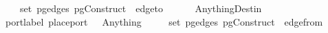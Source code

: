 \ \ \ {\isachardoublequoteopen}{\isasymnot}{\isacharparenleft}{\isasymexists}\ {\isasymin}\ set\ {\isacharparenleft}pg{\isacharunderscore}edges\ {\isacharparenleft}pgConstruct\ \ edge{\isacharunderscore}to\ \ {\isacharequal}\ \isanewline
\ \ {\isacharbar}\ {\isacharparenleft}Anything{\isacharunderscore}Destin{\isacharparenright}\isanewline
\ \ port{\isachardot}label\ {\isacharparenleft}place{\isacharunderscore}port\ \ {\isacharequal}\ Anything{\isachardoublequoteclose}\isanewline
\ \ \ {\isachardoublequoteopen}{\isasymnot}{\isacharparenleft}{\isasymexists}\ {\isasymin}\ set\ {\isacharparenleft}pg{\isacharunderscore}edges\ {\isacharparenleft}pgConstruct\ \ edge{\isacharunderscore}from\ \ {\isacharequal}\ 
